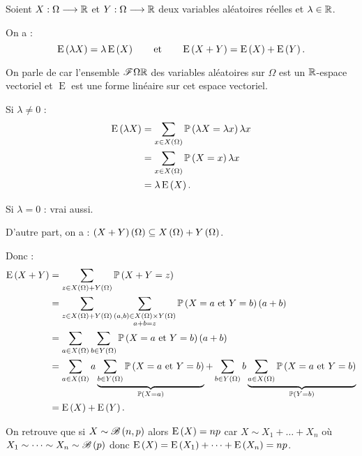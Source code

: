 \begin{prop}
Soient \(X:\Omega\longrightarrow\mathbb{R}\) et \(Y:\Omega\longrightarrow\mathbb{R}\) deux variables aléatoires réelles et \(\lambda\in\mathbb{R}\).

On a : \[\operatorname{E}\left(\lambda X\right)=\lambda\operatorname{E}\left(X\right)\qquad\text{et}\qquad\operatorname{E}\left(X+Y\right)=\operatorname{E}\left(X\right)+\operatorname{E}\left(Y\right).\]

On parle de  car l'ensemble \(\mathscr{F}{\Omega}{\mathbb{R}}\) des variables aléatoires sur \(\Omega\) est un \(\mathbb{R}\)-espace vectoriel et \(\operatorname{E}\) est une forme linéaire sur cet espace vectoriel.
\end{prop}

\begin{dem}
Si \(\lambda\not=0\) : \[\begin{aligned}
\operatorname{E}\left(\lambda X\right)&=\sum_{x\in X\left(\Omega\right)}\mathbb{P}\left(\lambda X=\lambda x\right)\lambda x \\
&=\sum_{x\in X\left(\Omega\right)}\mathbb{P}\left(X=x\right)\lambda x \\
&=\lambda\operatorname{E}\left(X\right).
\end{aligned}\]

Si \(\lambda=0\) : vrai aussi.

D'autre part, on a : \(\left(X+Y\right)\left(\Omega\right)\subseteq X\left(\Omega\right)+Y\left(\Omega\right)\).

Donc : \[\begin{aligned}
\operatorname{E}\left(X+Y\right)&=\sum_{z\in X\left(\Omega\right)+Y\left(\Omega\right)}\mathbb{P}\left(X+Y=z\right) \\
&=\sum_{z\in X\left(\Omega\right)+Y\left(\Omega\right)}\sum_{\substack{\left(a,b\right)\in X\left(\Omega\right)\times Y\left(\Omega\right) \\ a+b=z}}\mathbb{P}\left(X=a\text{ et }Y=b\right)\left(a+b\right) \\
&=\sum_{a\in X\left(\Omega\right)}\sum_{b\in Y\left(\Omega\right)}\mathbb{P}\left(X=a\text{ et }Y=b\right)\left(a+b\right) \\
&=\sum_{a\in X\left(\Omega\right)}a\underbrace{\sum_{b\in Y\left(\Omega\right)}\mathbb{P}\left(X=a\text{ et }Y=b\right)}_{\mathbb{P}\left(X=a\right)}+\sum_{b\in Y\left(\Omega\right)}b\underbrace{\sum_{a\in X\left(\Omega\right)}\mathbb{P}\left(X=a\text{ et }Y=b\right)}_{\mathbb{P}\left(Y=b\right)} \\
&=\operatorname{E}\left(X\right)+\operatorname{E}\left(Y\right).
\end{aligned}\]
\end{dem}

\begin{rem}
On retrouve que si \(X\sim\mathscr{B}\left(n,p\right)\) alors \(\operatorname{E}\left(X\right)=np\) car \(X\sim X_1+\dots+X_n\) où \(X_1\sim\dots\sim X_n\sim\mathscr{B}\left(p\right)\) donc \(\operatorname{E}\left(X\right)=\operatorname{E}\left(X_1\right)+\dots+\operatorname{E}\left(X_n\right)=np\).
\end{rem}

